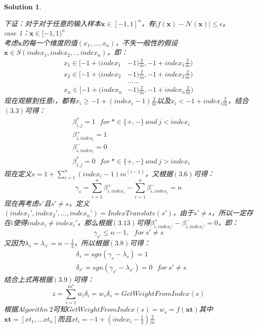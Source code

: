\documentclass[a4paper,UTF8]{article}
\numberwithin{equation}{section}
\newtheorem*{solution}{Solution}
\begin{document}
\begin{solution}
\begin{enumerate}[ {(}1{)}]
下证：对于对于任意的输入样本$ \mathbf{x} \in [-1,1]^n $，有$|f(\mathbf{x}) - \mathcal{N}(\mathbf{x})| \leq \epsilon$。\\
case 1：$ \mathbf{x} \in [-1,1)^n $\\
考虑$\mathbf{x}$的每一个维度的值$(x_1,...,x_n)$，不失一般性的假设$\mathbf{x} \in S(index_1, index_2,..,index_n)$，即：
\begin{equation}
\begin{aligned}
x_1 \in [-1+(index_1 &- 1)\frac{2}{m},-1 + index_1\frac{2}{m}) \\
x_2 \in [-1+(index_2 &- 1)\frac{2}{m},-1 + index_2\frac{2}{m}) \\
&......\\
x_n \in [-1+(index_n &- 1)\frac{2}{m},-1 + index_n\frac{2}{m})
\end{aligned}
\end{equation}
现在观察到任意$i$，都有$x_i \geq -1+(index_i - 1)\frac{2}{m}$以及$x_i < -1+index_i\frac{2}{m}$，结合$(3.3)$可得：
\begin{equation}
\begin{aligned}
&\beta_{i,j}^* = 1\ \ \ for\ *\in \{+,-\}\ and\ j < index_i\\
&\beta_{i,index_i}^+ = 1\\
&\beta_{i,index_i}^- = 0\\
&\beta_{i,j}^* = 0\ \ \ for\ *\in \{+,-\}\ and\ j > index_i
\end{aligned}
\end{equation}
现在定义$s= 1+\sum_{i=1}^{n}(index_i-1)m^{(i-1)}$，又根据$(3.6)$可得：
\begin{equation}
\gamma_s = \sum_{i=1}^{n}\beta_{i,index_i}^+ - \sum_{i=1}^{n}\beta_{i,index_i}^- = n
\end{equation}
现在再考虑$s'$且$s'\neq s$，定义$(index_1', index_2',...,index_n') = IndexTranslate(s')$，由于$s'\neq s$，所以一定存在$i$使得$index_i\neq index_i'$，那么根据$(3.13)$可得$\beta_{i,index_i'}^+ - \beta_{i,index_i'}^- = 0$，即：
\begin{equation}
\gamma_{s'} \leq n-1,\ \ \ for\ s'\neq s
\end{equation}
又因为$\lambda_s = \lambda_{s'} = n - \frac{1}{2}$，所以根据$(3.8)$可得：
\begin{equation}
\begin{aligned}
&\delta_s = sgn(\gamma_s - \lambda_s) = 1\\
&\delta_{s'} = sgn(\gamma_{s'} - \lambda_{s'}) = 0\ \ \ for\ s'\neq s
\end{aligned}
\end{equation}
结合上式再根据$(3.9)$可得：
\begin{equation}
z = \sum_{i=1}^{m^n}w_i\delta_i = w_s\delta_s = GetWeightFromIndex(s)
\end{equation}
根据$Algorithn\ 2$可知$GetWeightFromIndex(s) = w_s = f(\mathbf{xt})$其中$\mathbf{xt} = [xt_1,...xt_n]$而且$xt_i=  -1 + (index_i - \frac{1}{2})\frac{2}{m}$
\end{enumerate}


\end{solution}
\newpage
\end{document}
